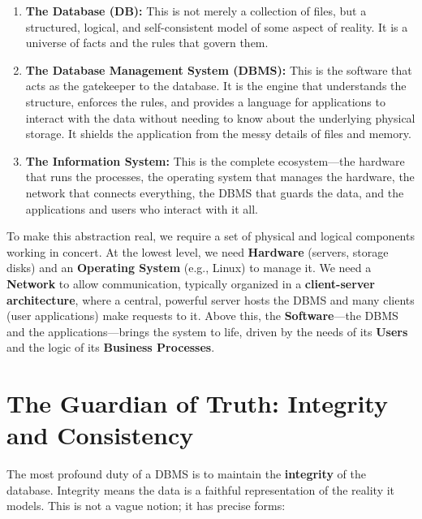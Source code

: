 \documentclass[12pt,a4paper]{article}
\begin{document}
\begin{enumerate}
    \item \textbf{The Database (DB):} This is not merely a collection of files, but a structured, logical, and self-consistent model of some aspect of reality. It is a universe of facts and the rules that govern them.
    
    \item \textbf{The Database Management System (DBMS):} This is the software that acts as the gatekeeper to the database. It is the engine that understands the structure, enforces the rules, and provides a language for applications to interact with the data without needing to know about the underlying physical storage. It shields the application from the messy details of files and memory.
    
    \item \textbf{The Information System:} This is the complete ecosystem---the hardware that runs the processes, the operating system that manages the hardware, the network that connects everything, the DBMS that guards the data, and the applications and users who interact with it all.
\end{enumerate}

To make this abstraction real, we require a set of physical and logical components working in concert. At the lowest level, we need \textbf{Hardware} (servers, storage disks) and an \textbf{Operating System} (e.g., Linux) to manage it. We need a \textbf{Network} to allow communication, typically organized in a \textbf{client-server architecture}, where a central, powerful server hosts the DBMS and many clients (user applications) make requests to it. Above this, the \textbf{Software}---the DBMS and the applications---brings the system to life, driven by the needs of its \textbf{Users} and the logic of its \textbf{Business Processes}.

\section{The Guardian of Truth: Integrity and Consistency}

The most profound duty of a DBMS is to maintain the \textbf{integrity} of the database. Integrity means the data is a faithful representation of the reality it models. This is not a vague notion; it has precise forms:
\end{document}
